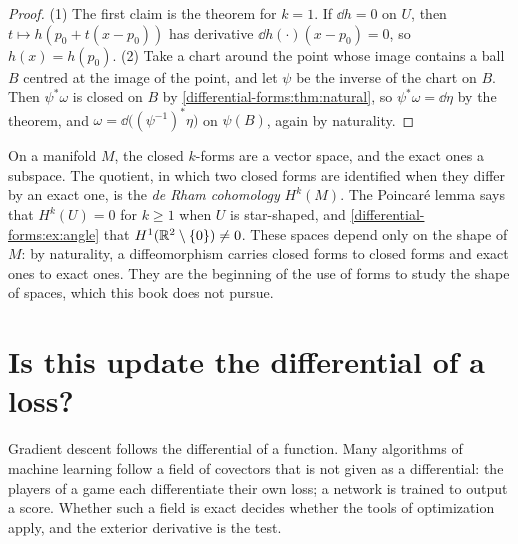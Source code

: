 \begin{notechapter}
\begin{proof}
(1) The first claim is the theorem for $k = 1$. If $\dd h = 0$ on $U$,
then $t\mapsto h(p_0 + t(x - p_0))$ has derivative
$\dd h(\cdot)(x - p_0) = 0$, so $h(x) = h(p_0)$. (2) Take a chart
around the point whose image contains a ball $B$ centred at the image
of the point, and let $\psi$ be the inverse of the chart on $B$. Then
$\psi^*\omega$ is closed on $B$ by
\cref{differential-forms:thm:natural}, so $\psi^*\omega = \dd\eta$ by
the theorem, and $\omega = \dd\bigl((\psi^{-1})^*\eta\bigr)$ on
$\psi(B)$, again by naturality.
\end{proof}

\begin{remark}\label{differential-forms:rem:cohomology}
On a manifold $M$, the closed $k$-forms are a vector space, and the
exact ones a subspace. The quotient, in which two closed forms are
identified when they differ by an exact one, is the \emph{de Rham
cohomology} $H^k(M)$. The Poincar\'e lemma says that $H^k(U) = 0$ for
$k\geq1$ when $U$ is star-shaped, and
\cref{differential-forms:ex:angle} that $H^1(\mathbb{R}^2\setminus\{0\})\neq0$.
These spaces depend only on the shape of $M$: by naturality, a
diffeomorphism carries closed forms to closed forms and exact ones to
exact ones. They are the beginning of the use of forms to study the
shape of spaces, which this book does not pursue.
\end{remark}

\section{Is this update the differential of a loss?}
\label{differential-forms:sec:ml}

Gradient descent follows the differential of a function. Many
algorithms of machine learning follow a field of covectors that is not
given as a differential: the players of a game each differentiate their
own loss; a network is trained to output a score. Whether such a field
is exact decides whether the tools of optimization apply, and the
exterior derivative is the test.


\end{notechapter}
